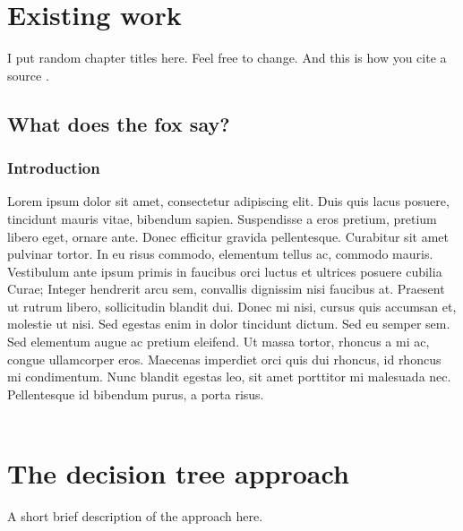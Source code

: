 \documentclass[12pt,a4paper,oneside]{report}
\begin{document}

\chapter{Existing work}
I put random chapter titles here. Feel free to change. And this is how you cite a source \cite{randomblogpost}.

\section{What does the fox say?}
\subsection{Introduction}
Lorem ipsum dolor sit amet, consectetur adipiscing elit. Duis quis lacus posuere, tincidunt mauris vitae, bibendum sapien. Suspendisse a eros pretium, pretium libero eget, ornare ante. Donec efficitur gravida pellentesque. Curabitur sit amet pulvinar tortor. In eu risus commodo, elementum tellus ac, commodo mauris. Vestibulum ante ipsum primis in faucibus orci luctus et ultrices posuere cubilia Curae; Integer hendrerit arcu sem, convallis dignissim nisi faucibus at. Praesent ut rutrum libero, sollicitudin blandit dui. Donec mi nisi, cursus quis accumsan et, molestie ut nisi. Sed egestas enim in dolor tincidunt dictum. Sed eu semper sem. Sed elementum augue ac pretium eleifend. Ut massa tortor, rhoncus a mi ac, congue ullamcorper eros. Maecenas imperdiet orci quis dui rhoncus, id rhoncus mi condimentum. Nunc blandit egestas leo, sit amet porttitor mi malesuada nec. Pellentesque id bibendum purus, a porta risus. \\\\


\chapter{The decision tree approach}
A short brief description of the approach here.
\end{document}
